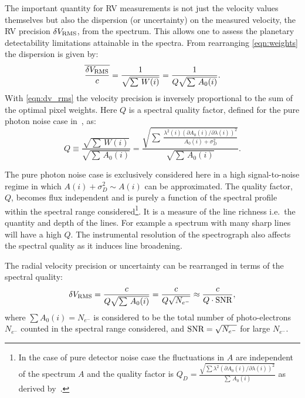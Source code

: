 The important quantity for {RV} measurements is not just the velocity values themselves but also the dispersion (or uncertainty) on the measured velocity, the {RV} precision \(\delta V_{\textrm{RMS}}\), from the spectrum.
This allows one to assess the planetary detectability limitations attainable in the spectra.
From rearranging \cref{eqn:weights} the dispersion is given by:
\begin{equation}
\overline{\frac{\delta V_{\textrm{RMS}}}{c}} = \frac{1}{\sqrt{\sum{\,W(i)}}} = \frac{1}{Q \sqrt{\sum{\,{A}_{0}(i)}}}.\label{eqn:dv_rms}
\end{equation}
With \cref{eqn:dv_rms} the velocity precision is inversely proportional to the sum of the optimal pixel weights.
Here \(Q\) is a spectral quality factor, defined for the pure photon noise case in~\citet{connes_absolute_1985, connes_demonstration_1996}, as:
\begin{equation}
Q \equiv \frac{\sqrt{\sum{\,W(i)}}}{\sqrt{\sum{\,{A}_{0}(i)}}} = \frac{\sqrt{\sum{\,\frac{{\lambda}^{2}(i) {({\partial {A}_{0}(i)}/{\partial \lambda(i)})}^{2}}{A_0(i) + {\sigma}^{2}_{D}}}}}{\sqrt{\sum{\,{A}_{0}(i)}}}. \label{eqn:quality_factor}
\end{equation}

The pure photon noise case is exclusively considered here in a high signal-to-noise regime in which \({A(i) + \sigma_{D}^{2}} \sim {A(i)}\) can be approximated.
The quality factor, \(Q\), becomes flux independent and is purely a function of the spectral profile within the spectral range considered\footnote{In the case of pure detector noise case the fluctuations in \(A\) are independent of the spectrum \(A\) and the quality factor is \({Q}_{D} = \frac{\sqrt{\sum{{\lambda}^{2} {(\partial {A}_{0}(i)/\partial \lambda(i))}^{2}}}}{\sum{\, {A}_{0}(i)}}\) as derived by~\citet{connes_absolute_1985}.}.
It is a measure of the line richness i.e.\ the quantity and depth of the lines.
For example a spectrum with many sharp lines will have a high \(Q\).
The instrumental resolution of the spectrograph also affects the spectral quality as it induces line broadening.

The radial velocity precision or uncertainty can be rearranged in terms of the spectral quality:
\begin{equation}
\delta V_{\textrm{RMS}} = \frac{c}{Q \sqrt{\sum {\,{A}_{0}(i)}}} = \frac{c}{Q \sqrt{{N}_{{e}^{-}}}} \approx \frac{c}{Q \cdot \textrm{SNR}{}},  \label{eqn:snr_relation}
\end{equation}
where \(\sum {A}_{0}(i) = {N}_{{e}^{-}}\) is considered to be the total number of photo-electrons \({N}_{{e}^{-}}\) counted in the spectral range considered, and \(\textrm{SNR}{}=\sqrt{N_{{e}^{-}}}\) for large \(N_{{e}^{-}}\).


